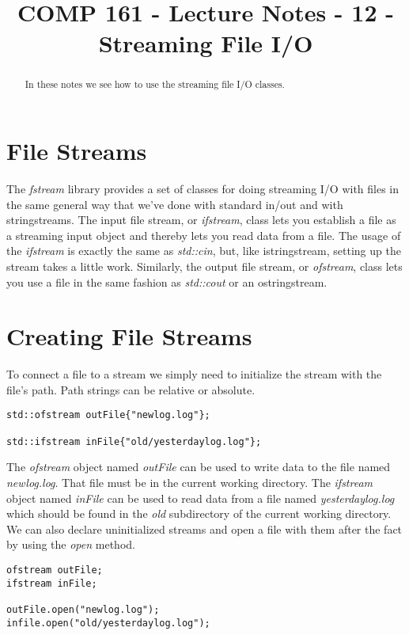\documentclass[nobib]{tufte-handout}
\title{COMP 161 - Lecture Notes - 12 - Streaming File I/O}
\begin{document}
 
\maketitle

\begin{abstract}
In these notes we see how to use the streaming file I/O classes. 
\end{abstract}

\section{File Streams}

The \textit{fstream} library provides a set of classes for doing streaming I/O with files in the same general way that we've done with standard in/out and with stringstreams. The input file stream, or \textit{ifstream}, class lets you establish a file as a streaming input object and thereby lets you read data from a file.  The usage of the \textit{ifstream} is exactly the same as \textit{std::cin}, but, like istringstream, setting up the stream takes a little work. Similarly, the output file stream, or \textit{ofstream}, class lets you use a file in the same fashion as \textit{std::cout} or an ostringstream.

\section{Creating File Streams}

To connect a file to a stream we simply need to initialize the stream with the file's path. Path strings can be relative or absolute.
\begin{verbatim}
std::ofstream outFile{"newlog.log"};

std::ifstream inFile{"old/yesterdaylog.log"};
\end{verbatim}
The \textit{ofstream} object named \textit{outFile} can be used to write data to the file named \textit{newlog.log}.  That file must be in the current working directory. The \textit{ifstream} object named \textit{inFile} can be used to read data from a file named \textit{yesterdaylog.log} which should be found in the \textit{old} subdirectory of the current working directory. We can also declare uninitialized streams and open a file with them after the fact by using the \textit{open } method.
\begin{verbatim}
ofstream outFile;
ifstream inFile;

outFile.open("newlog.log");
infile.open("old/yesterdaylog.log");
\end{verbatim}
\end{document}
